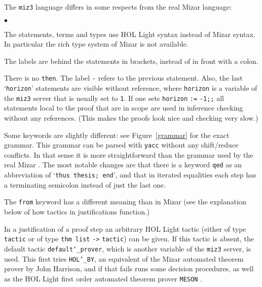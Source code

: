\documentclass{LMCS}
\begin{document}
The \texttt{miz3} language differs in some respects from the real Mizar language:
\begin{iteMize}{$\bullet$}
\item
The statements, terms and types use HOL Light syntax instead of Mizar 
syntax.
In particular the rich type system of Mizar \cite{wie:07:2} is not available.

\item
The labels are behind the statements in brackets, instead of
in front with a colon.

\item
There is no \texttt{then}.
The label \texttt{-} refers to the previous statement.
Also, the last `\texttt{horizon}' statements are visible without
reference, where \texttt{horizon} is a variable of the
\texttt{miz3} server that is usually set to \texttt{1}.
If one sets \texttt{horizon} \texttt{:=} \texttt{-1;;} all statements local
to the proof that are in scope are used in inference checking
without any references.
(This makes the proofs look nice and checking very slow.)

\item
Some keywords are slightly different:
see Figure~\ref{grammar} for the exact grammar.
This grammar can be parsed with \texttt{yacc} without
any shift/reduce conflicts.
In that sense it is more straightforward than the grammar used by the real Mizar \cite{cai:gow:04}.
The most notable changes are that
there is a keyword \texttt{qed} as an abbreviation of `\texttt{thus thesis; end}',
and that in iterated equalities {each} step has
a terminating semicolon instead of just the last one.

\item
The \texttt{from} keyword has a different meaning than in Mizar
(see the explanation below of how tactics in justifications function.)

\end{iteMize}

\noindent
In a justification of a proof step an arbitrary HOL Light tactic (either of
type \texttt{tactic} or of type \texttt{thm list} \texttt{->} \texttt{tactic}) can be given.
If this tactic is absent, the default tactic \texttt{default\char`\_{}prover}, which is another variable of the \texttt{miz3} server, is used.
This first tries \texttt{HOL\char`\_BY},
an equivalent of the Mizar automated theorem prover
by John Harrison, and if that fails runs some decision procedures, as well as the
HOL Light first order automated theorem prover \texttt{MESON} \cite{har:96:1}.
\end{document}
